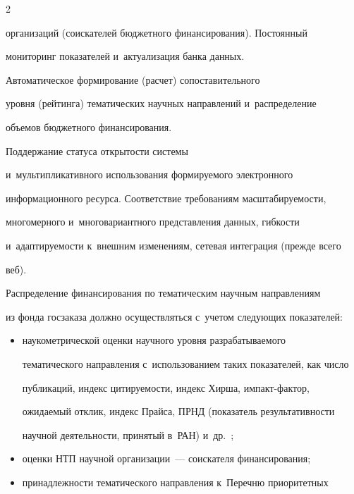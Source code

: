 \begin{multicols}{2}
\begin{description}
\mbox{организаций} (соискателей бюджетного финансирования). Постоянный 

мониторинг показателей и~актуализация банка данных.

    

    \item[F.] Автоматическое формирование (расчет) сопоставительного 

уровня (рейтинга) тематических научных на\-прав\-ле\-ний и~распределение 

объемов бюджетного финансирования.

    

     \item[G.] Поддержание статуса открытости системы 

и~мультипликативного использования фор\-ми\-ру\-емо\-го электронного 

информационного ресурса. Соответствие требованиям масштабируемости, 

многомерного и~многовариантного представления данных, гиб\-кости 

и~адап\-ти\-ру\-емости к~внешним изменениям, сетевая интеграция (прежде всего 

веб).

\end{description}

    

    Распределение финансирования по тематическим научным на\-прав\-ле\-ни\-ям 

из фонда госзаказа должно осуществляться с~учетом следующих показателей:

    \begin{itemize}

    \item наукометрической оценки научного уровня разрабатываемого 

тематического направления с~использованием таких показателей, как чис\-ло 

публикаций, индекс цитируемости, индекс Хирша, им\-пакт-фак\-тор, 

ожидаемый отклик, индекс Прайса, ПРНД (показатель результативности 

научной деятельности, принятый в~РАН) и~др.~\cite{2-sun, 8-sun};

    \item  оценки НТП научной организации~--- соискателя финансирования;

\item  принадлежности тематического на\-прав\-ле\-ния к~Перечню приоритетных 


\end{itemize}
\end{multicols}
